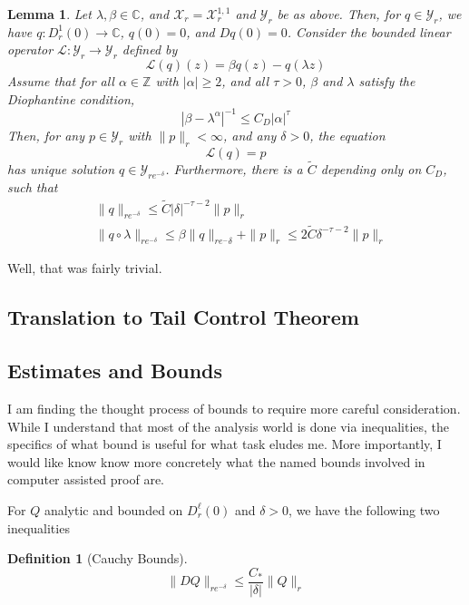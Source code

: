 \documentclass{article}
\newcommand{\C}{\mathbb{C}}
\newcommand{\Z}{\mathbb{Z}}
\newcommand{\X}{\mathcal{X}}
\newcommand{\Y}{\mathcal{Y}}
\theoremstyle{plain}
\newtheorem{lemma}{Lemma}
\newtheorem*{dfn}{Definition}
\theoremstyle{remark}
\begin{document}
\begin{lemma}
Let $\lambda, \beta \in \C$, and $\X_r = \X^{1,1}_r$ and $\Y_r$ be as above.
Then, for $q \in \Y_r$, we have $q : D^1_r(0) \to \C$, $q(0) = 0$, and $Dq(0) = 0$. 
Consider the bounded linear operator $\mathcal{L} : \Y_r \to \Y_r$ defined by
\[
\mathcal{L}(q)(z) = \beta q(z) - q(\lambda z)
\]
Assume that for all $\alpha \in \Z$ with $|\alpha| \geq 2$, and all $\tau > 0$, $\beta$ and $\lambda$ satisfy the Diophantine condition,
\[
|\beta - \lambda^\alpha |^{-1} \leq C_D |\alpha|^\tau
\]
Then, for any $p \in \Y_r$ with $\|p\|_r < \infty$, and any $\delta > 0$, the equation
\[
\mathcal{L}(q) = p
\]
has unique solution $q \in \Y_{re^{-\delta}}$. 
Furthermore, there is a $\tilde{C}$ depending only on $C_D$, such that
\begin{equation}
\begin{aligned}
&\|q\|_{re^{-\delta}} \leq \tilde{C} | \delta |^{-\tau - 2} \|p\|_r \\
&\|q \circ \lambda \|_{re^{-\delta}} \leq \beta \| q\|_{re^-\delta} + \|p \|_r \leq 2 \tilde{C}\delta^{-\tau - 2} \| p \|_r
\end{aligned}
\end{equation}
\end{lemma}

Well, that was fairly trivial.

\subsection{Translation to Tail Control Theorem}

\subsection{Estimates and Bounds}

I am finding the thought process of bounds to require more careful consideration. 
While I understand that most of the analysis world is done via inequalities, the specifics of what bound is useful for what task eludes me. 
More importantly, I would like know know more concretely what the named bounds involved in computer assisted proof are. 

\medskip 
\noindent
For $Q$ analytic and bounded on $D_r^\ell(0)$ and $\delta > 0$, we have the following two inequalities

\begin{dfn}[Cauchy Bounds]
\[
\| DQ \|_{re^{-\delta}} \leq \frac{C_*}{|\delta|} \| Q \|_r
\]
\end{dfn}
\end{document}
